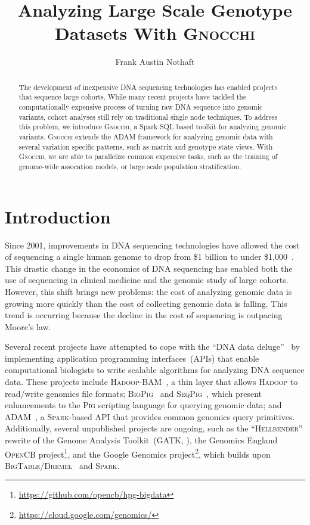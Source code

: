 \documentclass[11pt]{article} %
\begin{document}
\title{Analyzing Large Scale Genotype Datasets With \textsc{Gnocchi}}
\author{Frank Austin Nothaft} 
\date{}

\maketitle

\begin{abstract}
The development of inexpensive DNA sequencing technologies has enabled projects
that sequence large cohorts. While many recent projects have tackled the
computationally expensive process of turning raw DNA sequence into genomic
variants, cohort analyses still rely on traditional single node techniques. To
address this problem, we introduce \textsc{Gnocchi}, a Spark SQL based toolkit
for analyzing genomic variants. \textsc{Gnocchi} extends the \textsc{ADAM}
framework for analyzing genomic data with several variation specific patterns,
such as matrix and genotype state views. With \textsc{Gnocchi}, we are able to
parallelize common expensive tasks, such as the training of genome-wide
assocation models, or large scale population stratification.
\end{abstract}

\section{Introduction}
\label{sec:introduction}

Since 2001, improvements in DNA sequencing technologies have allowed the cost of
sequencing a single human genome to drop from \$1 billion to under
\$1,000~\cite{nhgri}. This drastic change in the economics of DNA sequencing
has enabled both the use of sequencing in clinical medicine and the genomic
study of large cohorts. However, this shift brings new problems: the cost of
analyzing genomic data is growing more quickly than the cost of collecting
genomic data is falling. This trend is occurring because the decline in the
cost of sequencing is outpacing Moore's law.

Several recent projects have attempted to cope with the ``DNA data
deluge''~\cite{schatz13} by implementing application programming
interfaces~(APIs) that enable computational biologists to write scalable
algorithms for analyzing DNA sequence data. These projects include
\textsc{Hadoop-BAM}~\cite{niemenmaa12}, a thin layer that allows \textsc{Hadoop}
to read/write genomics file formats; \textsc{BioPig}~\cite{nordberg13} and
\textsc{SeqPig}~\cite{schumacher14}, which present enhancements to the
\textsc{Pig} scripting language for querying genomic data; and
ADAM~\cite{massie13, nothaft15}, a \textsc{Spark}-based API that provides
common genomics query primitives. Additionally, several unpublished projects
are ongoing, such as the ``\textsc{Hellbender}'' rewrite of the Genome Analysis
Toolkit~(\textsc{GATK}, \cite{mckenna10}), the Genomics England
\textsc{OpenCB} project\footnote{\url{https://github.com/opencb/hpg-bigdata}},
and the Google Genomics project\footnote{\url{https://cloud.google.com/genomics/}},
which builds upon \textsc{BigTable}/\textsc{Dremel}~\cite{melnik10} and
\textsc{Spark}.
\end{document}
